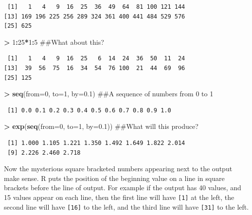 \documentclass[]{krantz}
\makeatletter
\newenvironment{Shaded}{\begin{snugshade}}{\end{snugshade}}
\newcommand{\KeywordTok}[1]{\textcolor[rgb]{0.27,0.27,0.27}{\textbf{#1}}}
\newcommand{\DataTypeTok}[1]{\textcolor[rgb]{0.27,0.27,0.27}{#1}}
\newcommand{\DecValTok}[1]{\textcolor[rgb]{0.06,0.06,0.06}{#1}}
\newcommand{\FloatTok}[1]{\textcolor[rgb]{0.06,0.06,0.06}{#1}}
\newcommand{\StringTok}[1]{\textcolor[rgb]{0.5,0.5,0.5}{#1}}
\newcommand{\OperatorTok}[1]{\textcolor[rgb]{0.43,0.43,0.43}{\textbf{#1}}}
\newcommand{\NormalTok}[1]{#1}
\newenvironment{kframe}{%
\medskip{}
\setlength{\fboxsep}{.8em}
 \def\at@end@of@kframe{}%
 \ifinner\ifhmode%
  \def\at@end@of@kframe{\end{minipage}}%
  \begin{minipage}{\columnwidth}%
 \fi\fi%
 \def\FrameCommand##1{\hskip\@totalleftmargin \hskip-\fboxsep
 \colorbox{shadecolor}{##1}\hskip-\fboxsep
     \hskip-\linewidth \hskip-\@totalleftmargin \hskip\columnwidth}%
 \MakeFramed {\advance\hsize-\width
   \@totalleftmargin\z@ \linewidth\hsize
   \@setminipage}}%
 {\par\unskip\endMakeFramed%
 \at@end@of@kframe}
\renewenvironment{Shaded}{\begin{kframe}}{\end{kframe}}
\makeatother
\begin{document}
\begin{verbatim}
 [1]   1   4   9  16  25  36  49  64  81 100 121 144
[13] 169 196 225 256 289 324 361 400 441 484 529 576
[25] 625
\end{verbatim}

\begin{Shaded}
\begin{Highlighting}[]
\OperatorTok{>}\StringTok{ }\DecValTok{1}\OperatorTok{:}\DecValTok{25}\OperatorTok{*}\DecValTok{1}\OperatorTok{:}\DecValTok{5}\NormalTok{ ##What about this?}
\end{Highlighting}
\end{Shaded}

\begin{verbatim}
 [1]   1   4   9  16  25   6  14  24  36  50  11  24
[13]  39  56  75  16  34  54  76 100  21  44  69  96
[25] 125
\end{verbatim}

\begin{Shaded}
\begin{Highlighting}[]
\OperatorTok{>}\StringTok{ }\KeywordTok{seq}\NormalTok{(}\DataTypeTok{from=}\DecValTok{0}\NormalTok{, }\DataTypeTok{to=}\DecValTok{1}\NormalTok{, }\DataTypeTok{by=}\FloatTok{0.1}\NormalTok{) ##A sequence of numbers from 0 to 1}
\end{Highlighting}
\end{Shaded}

\begin{verbatim}
 [1] 0.0 0.1 0.2 0.3 0.4 0.5 0.6 0.7 0.8 0.9 1.0
\end{verbatim}

\begin{Shaded}
\begin{Highlighting}[]
\OperatorTok{>}\StringTok{ }\KeywordTok{exp}\NormalTok{(}\KeywordTok{seq}\NormalTok{(}\DataTypeTok{from=}\DecValTok{0}\NormalTok{, }\DataTypeTok{to=}\DecValTok{1}\NormalTok{, }\DataTypeTok{by=}\FloatTok{0.1}\NormalTok{)) ##What will this produce?}
\end{Highlighting}
\end{Shaded}

\begin{verbatim}
 [1] 1.000 1.105 1.221 1.350 1.492 1.649 1.822 2.014
 [9] 2.226 2.460 2.718
\end{verbatim}

Now the mysterious square bracketed numbers appearing next to the output
make sense. R puts the position of the beginning value on a line in
square brackets before the line of output. For example if the output has
40 values, and 15 values appear on each line, then the first line will
have \texttt{{[}1{]}} at the left, the second line will have
\texttt{{[}16{]}} to the left, and the third line will have
\texttt{{[}31{]}} to the left.
\end{document}
